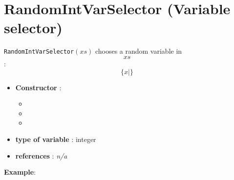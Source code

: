 \section{RandomIntVarSelector (Variable selector)}\label{randomvarint:randomvarintvarselector}\hypertarget{randomvarint:randomvarintvarselector}{}
\begin{notedef}
  \texttt{RandomIntVarSelector}$(xs)$ chooses a random variable in $$xs$$:
$$\{x | \}$$
\end{notedef}

\begin{itemize}
	\item \textbf{Constructor} : 
	\begin{itemize}
	\item {}
	\item {}
	\item {}
	\end{itemize}	
	\item \textbf{type of variable} : integer
	\item \textbf{references} : \emph{n/a}
\end{itemize}

\textbf{Example}:
%

